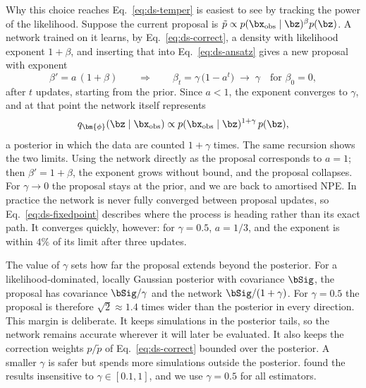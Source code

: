 Why this choice reaches Eq.~\eqref{eq:ds-temper} is easiest to see by
tracking the power of the likelihood. Suppose the current proposal is
$\tilde p\propto p(\bx_{\mathrm{obs}}\mid\bz)^{\beta}p(\bz)$. A network
trained on it learns, by Eq.~\eqref{eq:ds-correct}, a density with likelihood
exponent $1+\beta$, and inserting that into Eq.~\eqref{eq:ds-ansatz} gives a
new proposal with exponent
\begin{equation}
    \beta'=a\,(1+\beta)
    \qquad\Longrightarrow\qquad
    \beta_t=\gamma\,\bigl(1-a^{t}\bigr)\;\to\;\gamma
    \quad\text{for }\beta_0=0,
    \label{eq:ds-fixedpoint}
\end{equation}
after $t$ updates, starting from the prior. Since $a<1$, the exponent converges
to $\gamma$, and at that point the network itself represents
\begin{equation}
    q_{\bm{\phi}}(\bz\mid\bx_{\mathrm{obs}})\propto p(\bx_{\mathrm{obs}}\mid\bz)^{1+\gamma}\,p(\bz),
    \label{eq:ds-qfix}
\end{equation}
a posterior in which the data are counted $1+\gamma$ times. The same
recursion shows the two limits. Using the network directly as the proposal
corresponds to $a=1$; then $\beta'=1+\beta$, the exponent grows without
bound, and the proposal collapses. For $\gamma\to0$ the proposal stays at the
prior, and we are back to amortised NPE. In practice the network is never
fully converged between proposal updates, so Eq.~\eqref{eq:ds-fixedpoint}
describes where the process is heading rather than its exact path. It
converges quickly, however: for $\gamma=0.5$, $a=1/3$, and the exponent is
within $4\%$ of its limit after three updates.

The value of $\gamma$ sets how far the proposal extends beyond the posterior.
For a likelihood-dominated, locally Gaussian posterior with covariance
$\bSig$, the proposal has covariance $\bSig/\gamma$ and the network
$\bSig/(1+\gamma)$. For $\gamma=0.5$ the proposal is therefore
$\sqrt{2}\approx1.4$ times wider than the posterior in every direction. This
margin is deliberate. It keeps simulations in the posterior tails, so the
network remains accurate wherever it will later be evaluated. It also keeps
the correction weights $p/\tilde p$ of Eq.~\eqref{eq:ds-correct} bounded
over the posterior. A smaller $\gamma$ is safer but spends more simulations
outside the posterior. \citet{lyu_dynamic_2026} found the results insensitive
to $\gamma\in[0.1,1]$, and we use $\gamma=0.5$ for all estimators.


